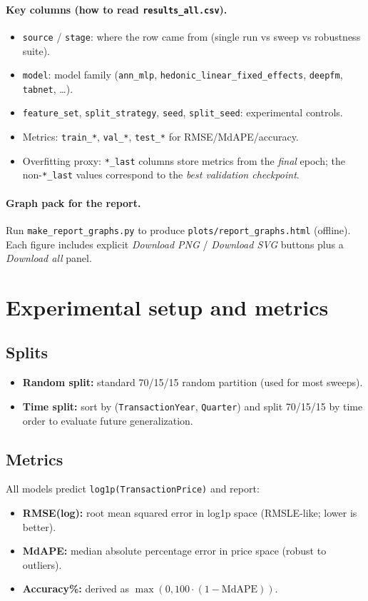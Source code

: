 \documentclass[11pt]{article}
\begin{document}
\paragraph{Key columns (how to read \texttt{results\_all.csv}).}
\begin{itemize}[leftmargin=*]
  \item \texttt{source} / \texttt{stage}: where the row came from (single run vs sweep vs robustness suite).
  \item \texttt{model}: model family (\texttt{ann\_mlp}, \texttt{hedonic\_linear\_fixed\_effects}, \texttt{deepfm}, \texttt{tabnet}, \dots).
  \item \texttt{feature\_set}, \texttt{split\_strategy}, \texttt{seed}, \texttt{split\_seed}: experimental controls.
  \item Metrics: \texttt{train\_*}, \texttt{val\_*}, \texttt{test\_*} for RMSE/MdAPE/accuracy.
  \item Overfitting proxy: \texttt{*\_last} columns store metrics from the \emph{final} epoch; the non-\texttt{*\_last} values correspond to the \emph{best validation checkpoint}.
\end{itemize}

\paragraph{Graph pack for the report.}
Run \texttt{make\_report\_graphs.py} to produce \texttt{plots/report\_graphs.html} (offline). Each figure includes explicit \emph{Download PNG} / \emph{Download SVG} buttons plus a \emph{Download all} panel.

\section{Experimental setup and metrics}
\subsection{Splits}
\begin{itemize}[leftmargin=*]
  \item \textbf{Random split:} standard 70/15/15 random partition (used for most sweeps).
  \item \textbf{Time split:} sort by (\texttt{TransactionYear}, \texttt{Quarter}) and split 70/15/15 by time order to evaluate future generalization.
\end{itemize}

\subsection{Metrics}
All models predict \texttt{log1p(TransactionPrice)} and report:
\begin{itemize}[leftmargin=*]
  \item \textbf{RMSE(log):} root mean squared error in log1p space (RMSLE-like; lower is better).
  \item \textbf{MdAPE:} median absolute percentage error in price space (robust to outliers).
  \item \textbf{Accuracy\%:} derived as \(\max(0, 100\cdot(1-\text{MdAPE}))\).
\end{itemize}
\end{document}

